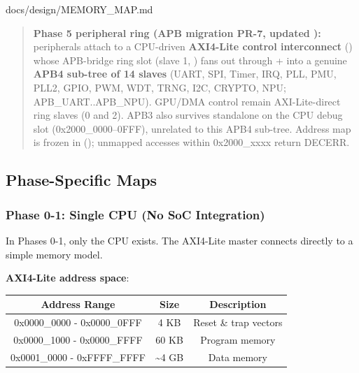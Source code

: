 \begin{relocated}{docs/design/MEMORY_MAP.md}
{}

\begin{quote}
\textbf{Phase 5 peripheral ring (APB migration PR-7, updated ):}
peripherals attach to a CPU-driven \textbf{AXI4-Lite control
interconnect} () whose APB-bridge
ring slot (slave 1, ) fans out through
 +  into a genuine \textbf{APB4
sub-tree of 14 slaves} (UART, SPI, Timer, IRQ, PLL, PMU, PLL2, GPIO,
PWM, WDT, TRNG, I2C, CRYPTO, NPU; 
APB\_\allowbreak{}UART..APB\_\allowbreak{}NPU). GPU/DMA control remain
AXI-Lite-direct ring slaves (0 and 2). APB3 also survives standalone on
the CPU debug slot (0x2000\_\allowbreak{}0000--0FFF), unrelated to this
APB4 sub-tree. Address map is frozen in
 ();
unmapped accesses within 0x2000\_\allowbreak{}xxxx return DECERR.
\end{quote}

\subsection{Phase-Specific Maps}\label{ds:mm:memory-map:phase-specific-maps}

\subsubsection{Phase 0-1: Single CPU (No SoC Integration)}\label{ds:mm:memory-map:phase-0-1-single-cpu-no-soc-integration}

In Phases 0-1, only the CPU exists. The AXI4-Lite master connects
directly to a simple memory model.

\textbf{AXI4-Lite address space}:

{
\begin{longtable}[]{@{}ccc@{}}
\toprule\noalign{}
Address Range & Size & Description \\
\midrule\noalign{}
\endhead
\bottomrule\noalign{}
\endlastfoot
0x0000\_\allowbreak{}0000 - 0x0000\_\allowbreak{}0FFF & 4 KB & Reset \&
trap vectors \\
0x0000\_\allowbreak{}1000 - 0x0000\_\allowbreak{}FFFF & 60 KB & Program
memory \\
0x0001\_\allowbreak{}0000 - 0xFFFF\_\allowbreak{}FFFF & \textasciitilde4
GB & Data memory \\
\end{longtable}
}


\end{relocated}
